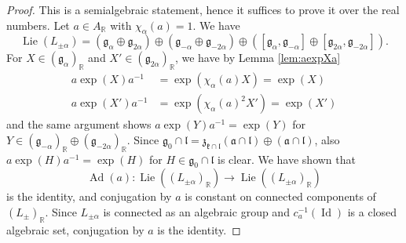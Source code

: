 \documentclass[12pt]{amsart}
\newcommand{\R}{\mathbb{R} }
\newcommand{\frakg}{\mathfrak{g}}
\newcommand{\frakk}{\mathfrak{k}}
\newcommand{\fraka}{\mathfrak{a}}
\newcommand{\frakl}{\mathfrak{l}}
\numberwithin{equation}{section}
\theoremstyle{remark} %
\begin{document}
\begin{proof}
This is a semialgebraic statement, hence it suffices to prove it over the real numbers. Let $a \in A_\R$ with $\chi_\alpha(a) = 1$. We have 
$$
\operatorname{Lie}(L_{\pm \alpha}) = ( \frakg_\alpha \oplus \frakg_{2\alpha} ) \oplus (\frakg_{-\alpha} \oplus \frakg_{-2\alpha} ) \oplus ( [\frakg_\alpha , \frakg_{-\alpha}] \oplus [\frakg_{2\alpha}, \frakg_{-2\alpha}] ).
$$ 
For $X \in (\frakg_\alpha)_\R$ and $X' \in (\frakg_{2\alpha})_\R$, we have by Lemma \ref{lem:aexpXa}
\begin{align*}
	a \exp(X) a^{-1} & = \exp(\chi_\alpha(a)X ) = \exp(X) \\
	a \exp(X') a^{-1}  & = \exp(\chi_\alpha(a)^2 X') = \exp(X')
\end{align*}
and the same argument shows $a \exp(Y) a^{-1} = \exp(Y) $ for $Y \in (\frakg_{-\alpha})_\R \oplus (\frakg_{-2\alpha})_\R$. Since $\frakg_0 \cap \frakl = \mathfrak{z}_{\frakk\cap \frakl} (\fraka \cap \frakl) \oplus (\fraka \cap \frakl)$, also $a \exp(H)a^{-1} =\exp(H)$ for $H \in \frakg_0 \cap \frakl$ is clear. We have shown that 
$$
\operatorname{Ad}(a) \colon \operatorname{Lie}((L_{\pm \alpha})_\R) \to  \operatorname{Lie}((L_{\pm \alpha})_\R) 
$$
is the identity, and conjugation by $a$ is constant on connected components of $(L_{\pm})_\R$. Since $L_{\pm \alpha}$ is connected as an algebraic group and $c_a^{-1}(\operatorname{Id})$ is a closed algebraic set, %
conjugation by $a$ is the identity.
\end{proof}
\end{document}
